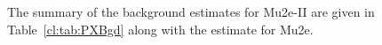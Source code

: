 
The summary of the background estimates for Mu2e-II are given in
Table~\ref{cl:tab:PXBgd} along with the estimate for Mu2e.

